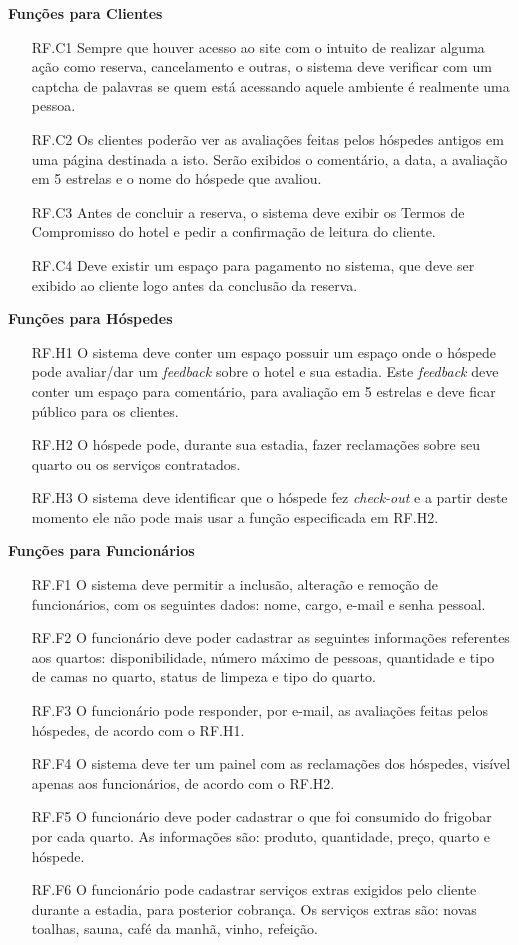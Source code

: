 \documentclass[notitlepage]{article}
\begin{document}
\textbf{Funções para Clientes}
\begin{enumerate}
	\item[RF.C1 ] Sempre que houver acesso ao site com o intuito de realizar alguma ação como reserva, cancelamento e outras, o sistema deve verificar com um captcha de palavras se quem está acessando aquele ambiente é realmente uma pessoa. 
	\item[RF.C2 ] Os clientes poderão ver as avaliações feitas pelos hóspedes antigos em uma página destinada a isto. Serão exibidos o comentário, a data, a avaliação em 5 estrelas e o nome do hóspede que avaliou.
	\item[RF.C3 ] Antes de concluir a reserva, o sistema deve exibir os Termos de Compromisso do hotel e pedir a confirmação de leitura do cliente.
	\item[RF.C4 ] Deve existir um espaço para pagamento no sistema, que deve ser exibido ao cliente logo antes da conclusão da reserva.
\end{enumerate}
\textbf{Funções para Hóspedes}
\begin{enumerate}
	\item[RF.H1 ] O sistema deve conter um espaço possuir um espaço onde o hóspede pode avaliar/dar um \textit{feedback} sobre o hotel e sua estadia. Este \textit{feedback} deve conter um espaço para comentário, para avaliação em 5 estrelas e deve ficar público para os clientes. 
	\item[RF.H2 ] O hóspede pode, durante sua estadia, fazer reclamações sobre seu quarto ou os serviços contratados.
	\item[RF.H3 ] O sistema deve identificar que o hóspede fez \textit{check-out} e a partir deste momento ele não pode mais usar a função especificada em RF.H2. 
\end{enumerate}
\textbf{Funções para Funcionários}
\begin{enumerate}
	\item[RF.F1 ] O sistema deve permitir a inclusão, alteração e remoção de funcionários, com os seguintes dados: nome, cargo, e-mail e senha pessoal. 
	\item[RF.F2 ] O funcionário deve poder cadastrar as seguintes informações referentes aos quartos: disponibilidade, número máximo de pessoas, quantidade e tipo de camas no quarto, status de limpeza e tipo do quarto.
	\item[RF.F3 ] O funcionário pode responder, por e-mail, as avaliações feitas pelos hóspedes, de acordo com o RF.H1.
	\item[RF.F4 ] O sistema deve ter um painel com as reclamações dos hóspedes, visível apenas aos funcionários, de acordo com o RF.H2. 
	\item[RF.F5 ] O funcionário deve poder cadastrar o que foi consumido do frigobar por cada quarto. As informações são: produto, quantidade, preço, quarto e hóspede.
	\item[RF.F6 ] O funcionário pode cadastrar serviços extras exigidos pelo cliente durante a estadia, para posterior cobrança. Os serviços extras são: novas toalhas, sauna, café da manhã, vinho, refeição.
\end{enumerate}
\end{document}
